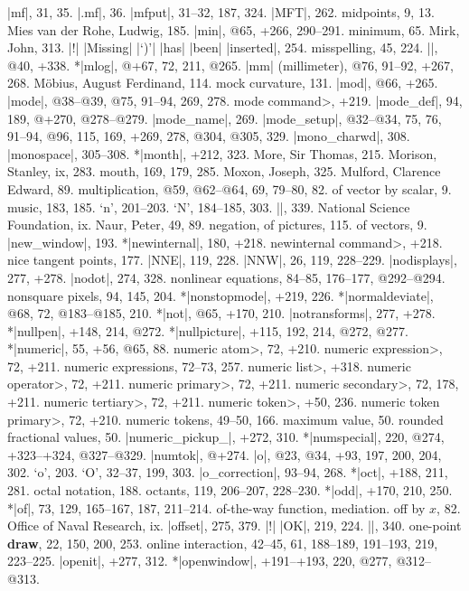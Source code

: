 |mf|, 31, 35.
|.mf|, 36.
|mfput|, 31--32, 187, 324.
|MFT|, 262.
midpoints, 9, 13.
Mies van der Rohe, Ludwig, 185.
|min|, @65, +266, 290--291.
minimum, 65.
Mirk, John, 313.
|!| |Missing| |`)'| |has| |been| |inserted|, 254.
misspelling, 45, 224.
|\mixture|, @40, +338.
*|mlog|, @+67, 72, 211, @265.
|mm| (millimeter), @76, 91--92, +267, 268.
M\"obius, August Ferdinand, 114.
mock curvature, 131.
|mod|, @66, +265.
|mode|, @38--@39, @75, 91--94, 269, 278.
\<mode command>, +219.
|mode_def|, 94, 189, @+270, @278--@279.
|mode_name|, 269.
|mode_setup|, @32--@34, 75, 76, 91--94, @96, 115, 169, +269, 278, @304, @305,
 329.
|mono_charwd|, 308.
|monospace|, 305--308.
*|month|, +212, 323.
More, Sir Thomas, 215.
Morison, Stanley, ix, 283.
mouth, 169, 179, 285.
Moxon, Joseph, 325.
Mulford, Clarence Edward, 89.
multiplication, @59, @62--@64, 69, 79--80, 82.
\sub of vector by scalar, 9.
music, 183, 185.
\newletter
`n', 201--203.
`N', 184--185, 303.
|\names|, 339.
National Science Foundation, ix.
Naur, Peter, 49, 89.
negation, of pictures, 115.
\sub of vectors, 9.
|new_window|, 193.
*|newinternal|, 180, +218.
\<newinternal command>, +218.
nice tangent points, 177.
|NNE|, 119, 228.
|NNW|, 26, 119, 228--229.
|nodisplays|, 277, +278.
|nodot|, 274, 328.
nonlinear equations, 84--85, 176--177, @292--@294.
nonsquare pixels, 94, 145, 204.
*|nonstopmode|, +219, 226.
*|normaldeviate|, @68, 72, @183--@185, 210.
*|not|, @65, +170, 210.
|notransforms|, 277, +278.
*|nullpen|, +148, 214, @272.
*|nullpicture|, +115, 192, 214, @272, @277.
*|numeric|, 55, +56, @65, 88.
\<numeric atom>, 72, +210.
\<numeric expression>, 72, +211.
numeric expressions, 72--73, 257.
\<numeric list>, +318.
\<numeric operator>, 72, +211.
\<numeric primary>, 72, +211.
\<numeric secondary>, 72, 178, +211.
\<numeric tertiary>, 72, +211.
\<numeric token>, +50, 236.
\<numeric token primary>, 72, +210.
numeric tokens, 49--50, 166.
\sub maximum value, 50.
\sub rounded fractional values, 50.
|numeric_pickup_|, +272, 310.
*|numspecial|, 220, @274, +323--+324, @327--@329.
|numtok|, @+274.
\newletter
|o|, @23, @34, +93, 197, 200, 204, 302.
`o', 203.
`O', 32--37, 199, 303.
|o_correction|, 93--94, 268.
*|oct|, +188, 211, 281.
octal notation, 188.
octants, 119, 206--207, 228--230.
*|odd|, +170, 210, 250.
*|of|, 73, 129, 165--167, 187, 211--214.
of-the-way function, \see mediation.
off by $x$, 82.
Office of Naval Research, ix.
|offset|, 275, 379.
|!| |OK|, 219, 224.
|\omitaccents|, 340.
one-point {\bf draw}, 22, 150, 200, 253.
online interaction, 42--45, 61, 188--189, 191--193, 219, 223--225.
|openit|, +277, 312.
*|openwindow|, +191--+193, 220, @277, @312--@313.
